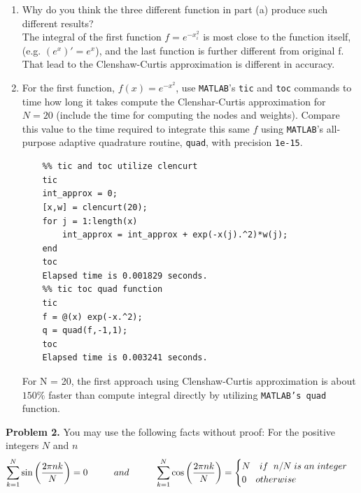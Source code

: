 \documentclass[14pt,a4paper]{article}
\begin{document}
\begin{enumerate}
	\label{1b}
	\item Why do you think the three different function in part (a) produce such different results? \\
	The integral of the first function $f = e^{-x_i^2}$ is most close to the function itself, (e.g. $(e^x)' = e^x$), and the last function is further different from original f. That lead to the Clenshaw-Curtis approximation is different in accuracy.\\
	
	
	\label{1c}
	\item For the first function, $f(x) = e^{-x^2}$, use \texttt{MATLAB}'s \texttt{tic} and \texttt{toc} commands to time how long it takes compute the Clenshar-Curtis approximation for $N = 20$ (include the time for computing the nodes and weights). Compare this value to the time required to integrate this same $f$ using \texttt{MATLAB}'s all-purpose adaptive quadrature routine, \texttt{quad}, with precision \texttt{1e-15}. 
	\begin{lstlisting}
	%% tic and toc utilize clencurt
	tic
	int_approx = 0;
	[x,w] = clencurt(20);
	for j = 1:length(x)
		int_approx = int_approx + exp(-x(j).^2)*w(j);
	end
	toc
	Elapsed time is 0.001829 seconds.
	%% tic toc quad function
	tic
	f = @(x) exp(-x.^2);
	q = quad(f,-1,1);
	toc
	Elapsed time is 0.003241 seconds.
	\end{lstlisting}
	For N = 20, the first approach using Clenshaw-Curtis approximation is about $150\%$ faster than compute integral directly by utilizing \texttt{MATLAB's quad} function.
	
\end{enumerate}
\pagebreak

\label{Problem 2}
\large\textbf{Problem 2.} You may use the following facts without proof: For the positive integers $N$ and $n$ 
$$ \sum_{k=1}^{N}\sin\left(\dfrac{2\pi nk}{N} \right) = 0 \hspace{1cm} and \hspace{1cm} \sum_{k=1}^{N}\cos\left(\dfrac{2\pi nk}{N}\right) = \begin{cases} N \quad if \hspace{2mm} n/N \hspace{1mm} is\hspace{1mm} an \hspace{1mm} integer \\ 0 \quad otherwise \end{cases} $$
 
\end{document}
